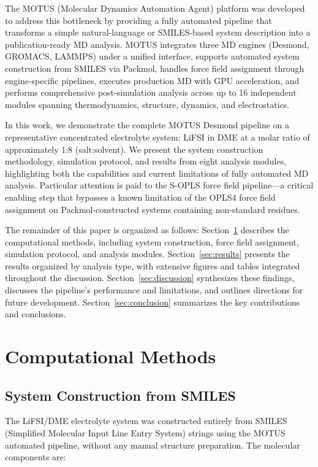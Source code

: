 \documentclass[twocolumn,10pt]{article}
\begin{document}
The MOTUS (Molecular Dynamics Automation Agent) platform was developed to address this bottleneck by providing a fully automated pipeline that transforms a simple natural-language or SMILES-based system description into a publication-ready MD analysis. MOTUS integrates three MD engines (Desmond, GROMACS, LAMMPS) under a unified interface, supports automated system construction from SMILES via Packmol, handles force field assignment through engine-specific pipelines, executes production MD with GPU acceleration, and performs comprehensive post-simulation analysis across up to 16 independent modules spanning thermodynamics, structure, dynamics, and electrostatics.

In this work, we demonstrate the complete MOTUS Desmond pipeline on a representative concentrated electrolyte system: LiFSI in DME at a molar ratio of approximately 1:8 (salt:solvent). We present the system construction methodology, simulation protocol, and results from eight analysis modules, highlighting both the capabilities and current limitations of fully automated MD analysis. Particular attention is paid to the S-OPLS force field pipeline---a critical enabling step that bypasses a known limitation of the OPLS4 force field assignment on Packmol-constructed systems containing non-standard residues.

The remainder of this paper is organized as follows: Section~\ref{sec:methods} describes the computational methods, including system construction, force field assignment, simulation protocol, and analysis modules. Section~\ref{sec:results} presents the results organized by analysis type, with extensive figures and tables integrated throughout the discussion. Section~\ref{sec:discussion} synthesizes these findings, discusses the pipeline's performance and limitations, and outlines directions for future development. Section~\ref{sec:conclusion} summarizes the key contributions and conclusions.

\section{Computational Methods}
\label{sec:methods}

\subsection{System Construction from SMILES}
The LiFSI/DME electrolyte system was constructed entirely from SMILES (Simplified Molecular Input Line Entry System) strings using the MOTUS automated pipeline, without any manual structure preparation. The molecular components are:
\end{document}
